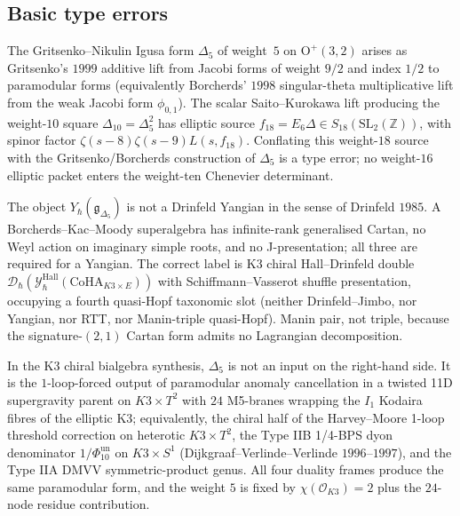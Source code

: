 \subsection*{Basic type errors}

\begin{description}[itemsep=4pt, leftmargin=2.0em, style=nextline]
\item[T1 (Ikeda $\leftrightarrow$ Gritsenko conflation).]
The Gritsenko--Nikulin Igusa form $\Delta_5$ of weight~$5$ on $\mathrm{O}^+(3,2)$
arises as Gritsenko's $1999$ additive lift from Jacobi forms of weight $9/2$ and
index $1/2$ to paramodular forms (equivalently Borcherds' $1998$ singular-theta
multiplicative lift from the weak Jacobi form $\phi_{0,1}$). The scalar
Saito--Kurokawa lift producing the weight-$10$ square
$\Delta_{10}=\Delta_5^2$ has elliptic source
$f_{18}=E_6\Delta\in S_{18}(\mathrm{SL}_2(\mathbb Z))$, with spinor
factor $\zeta(s-8)\zeta(s-9)L(s,f_{18})$. Conflating this
weight-$18$ source with the Gritsenko/Borcherds construction of
$\Delta_5$ is a type error; no weight-$16$ elliptic packet enters the
weight-ten Chenevier determinant.

\item[T2 (BKM-as-Yangian conflation).]
The object $Y_\hbar(\mathfrak{g}_{\Delta_5})$ is not a Drinfeld Yangian in the
sense of Drinfeld $1985$. A Borcherds--Kac--Moody superalgebra has infinite-rank
generalised Cartan, no Weyl action on imaginary simple roots, and no
J-presentation; all three are required for a Yangian. The correct label is K3
chiral Hall--Drinfeld double
$\mathcal{D}_\hbar(\mathcal{Y}^{\mathrm{Hall}}_\hbar(\mathrm{CoHA}_{K3\times E}))$
with Schiffmann--Vasserot shuffle presentation, occupying a fourth quasi-Hopf
taxonomic slot (neither Drinfeld--Jimbo, nor Yangian, nor RTT, nor Manin-triple
quasi-Hopf). Manin pair, not triple, because the signature-$(2,1)$ Cartan form
admits no Lagrangian decomposition.

\item[T3 ($\Delta_5$ as input vs output).]
In the K3 chiral bialgebra synthesis, $\Delta_5$ is not an input on
the right-hand side. It is the
$1$-loop-forced output of paramodular anomaly cancellation in a twisted 11D
supergravity parent on $K3\times T^2$ with $24$ M5-branes wrapping the $I_1$
Kodaira fibres of the elliptic K3; equivalently, the chiral half of the
Harvey--Moore 1-loop threshold correction on heterotic $K3\times T^2$, the
Type IIB 1/4-BPS dyon denominator $1/\Phi_{10}^{\mathrm{un}}$ on $K3\times S^1$
(Dijkgraaf--Verlinde--Verlinde $1996$--$1997$), and the Type IIA DMVV
symmetric-product genus. All four duality frames produce the same paramodular
form, and the weight $5$ is fixed by $\chi(\mathcal{O}_{K3})=2$ plus the
$24$-node residue contribution.


\end{description}
